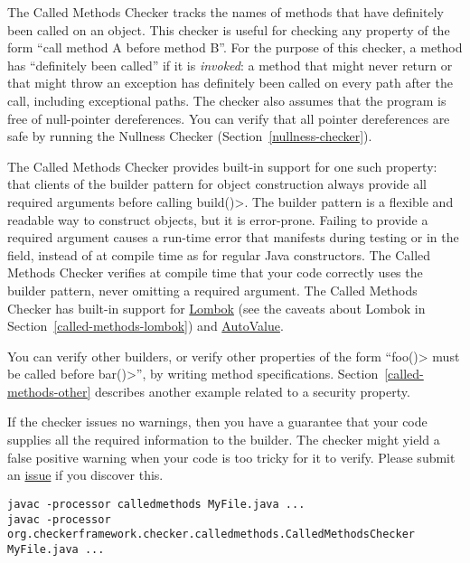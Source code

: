 \htmlhr
{}

The Called Methods Checker tracks the names of methods that have definitely
been called on an object. This checker is useful for checking any property
of the form ``call method A before method B''. For the purpose of this
checker, a method has ``definitely been called'' if it is \emph{invoked}:
a method that might never return or that might throw an exception has
definitely been called on every path after the call, including exceptional paths.
The checker also assumes that the program is free of null-pointer dereferences.
You can verify that all pointer dereferences are safe
by running the Nullness Checker (Section~\ref{nullness-checker}).

The Called Methods Checker provides built-in support for one such property:
that clients of the builder pattern for object
construction always provide all required arguments before calling
\<build()>.  The builder pattern is a flexible and readable way to
construct objects, but it is error-prone.  Failing to provide
a required argument causes a run-time error that manifests during testing
or in the field, instead of at compile time as for regular Java
constructors.  The Called Methods Checker verifies at compile time that
your code correctly uses the builder pattern, never omitting a required
argument. The Called Methods Checker has built-in support for
\href{https://projectlombok.org/}{Lombok} (see the caveats about Lombok in
Section~\ref{called-methods-lombok}) and
\href{https://github.com/google/auto/blob/master/value/userguide/index.md}{AutoValue}.

You can verify other builders, or verify other properties of the form
``\<foo()> must be called before \<bar()>'', by writing method specifications.
Section~\ref{called-methods-other} describes another example related to a
security property.

If the checker issues no warnings, then you have a guarantee that your code
supplies all the required information to the builder.  The checker might
yield a false positive warning when your code is too tricky for it to
verify.  Please submit an
\href{https://github.com/typetools/checker-framework/issues}{issue} if you
discover this.



\begin{Verbatim}
javac -processor calledmethods MyFile.java ...
javac -processor org.checkerframework.checker.calledmethods.CalledMethodsChecker MyFile.java ...
\end{Verbatim}

